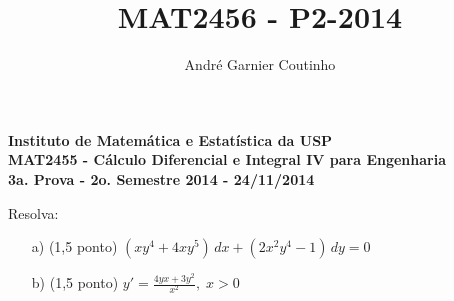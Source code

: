 \documentclass[12pt,a4paper]{article}
\title{MAT2456 - P2-2014}
\author{André Garnier Coutinho}
\begin{document}
\begin{center}
\textbf{Instituto de Matemática e Estatística da USP\\
MAT2455 - Cálculo Diferencial e Integral IV para Engenharia\\}
\textbf{3a. Prova - 2o. Semestre 2014 - 24/11/2014}
\end{center}

 Resolva:
\begin{itemize}
	\item[a)] (1,5 ponto) $(xy^4 + 4xy^5)\,dx + (2x^2 y^4 -1)\,dy = 0$
	
	\item[b)] (1,5 ponto) $y' = \displaystyle\frac{4yx + 3y^2}{x^2}, \; x>0$
\end{itemize}
\end{document}
